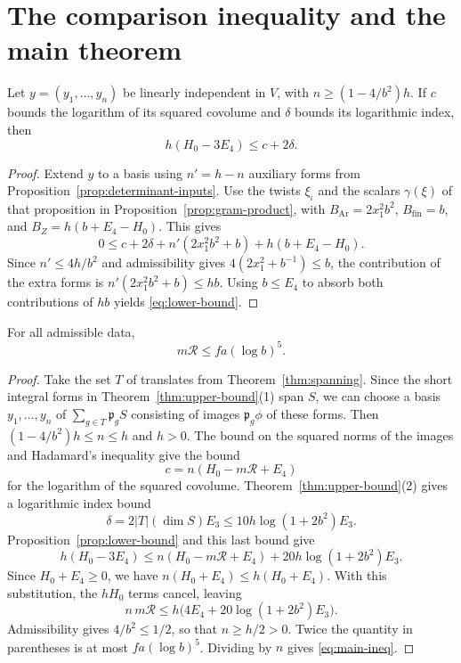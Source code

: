\section{The comparison inequality and the main theorem}\label{sec:conclusion}

\begin{proposition}\label{prop:lower-bound}
Let \(y=(y_1,\ldots,y_n)\) be linearly independent in \(V\), with
\(n\ge(1-4/b^2)h\). If \(c\) bounds the logarithm of its squared
covolume and \(\delta\) bounds its logarithmic index, then
\begin{equation}\label{eq:lower-bound}
  h(H_0-3E_4)\le c+2\delta .
\end{equation}
\end{proposition}

\begin{proof}
Extend \(y\) to a basis using \(n'=h-n\) auxiliary forms from
Proposition~\ref{prop:determinant-inputs}. Use the twists \(\xi_\iota\)
and the scalars \(\gamma(\xi)\) of that proposition in
Proposition~\ref{prop:gram-product}, with \(B_{\mathrm{Ar}}=2x_1^2b^2\),
\(B_{\mathrm{fin}}=b\), and \(B_Z=h(b+E_4-H_0)\). This gives
\[
 0\le c+2\delta+n'(2x_1^2b^2+b)+h(b+E_4-H_0).
\]
Since \(n'\le4h/b^2\) and admissibility gives
\(4(2x_1^2+b^{-1})\le b\), the contribution of the extra forms is
\(n'(2x_1^2b^2+b)\le hb\).
Using \(b\le E_4\) to absorb both contributions of \(hb\) yields
\eqref{eq:lower-bound}.
\end{proof}

\begin{theorem}\label{thm:main-inequality}
For all admissible data,
\begin{equation}\label{eq:main-ineq}
 m\mathcal R\le fa(\log b)^5 .
\end{equation}
\end{theorem}

\begin{proof}
Take the set \(T\) of translates from Theorem~\ref{thm:spanning}.
Since the short integral forms in Theorem~\ref{thm:upper-bound}(1)
span \(S\), we can choose a basis \(y_1,\ldots,y_n\) of
\(\sum_{g\in T}\mathfrak p_g S\) consisting of images \(\mathfrak p_g\phi\)
of these forms. Then \((1-4/b^2)h\le n\le h\) and \(h>0\).
The bound on the squared norms of the images and Hadamard's inequality
give the bound
\[
   c=n(H_0-m\mathcal R+E_4)
\]
for the logarithm of the squared covolume.
Theorem~\ref{thm:upper-bound}(2) gives a logarithmic index bound
\[
  \delta=2|T|(\dim S)E_3\le 10h\log(1+2b^2)E_3.
\]
Proposition~\ref{prop:lower-bound} and this last bound give
\[
 h(H_0-3E_4)
  \le n(H_0-m\mathcal R+E_4)+20h\log(1+2b^2)E_3.
\]
Since \(H_0+E_4\ge0\), we have \(n(H_0+E_4)\le h(H_0+E_4)\).
With this substitution, the \(hH_0\) terms cancel, leaving
\[
 n\,m\mathcal R
   \le h\bigl(4E_4+20\log(1+2b^2)E_3\bigr).
\]
Admissibility gives \(4/b^2\le1/2\), so that \(n\ge h/2>0\).
Twice the quantity in parentheses is at most \(fa(\log b)^5\).
Dividing by \(n\) gives \eqref{eq:main-ineq}.
\end{proof}

